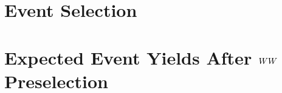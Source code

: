 \documentclass{cmspaper}
\begin{document}
\section{Event Selection}
  \label{sec:selection} 
  

\section{Expected Event Yields After $WW$ Preselection}
  \label{sec:yields}
  
\end{document}
